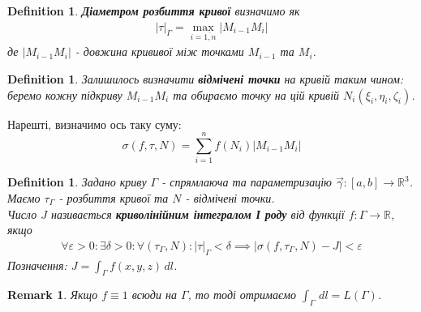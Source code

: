 \documentclass[a4paper, 10pt]{article}
\def\huge{\displaystyle}
\theoremstyle{theoremdd}
\theoremstyle{theoremdd}
\newtheorem{definition}[theorem]{Definition}
\theoremstyle{theoremdd}
\theoremstyle{theoremdd}
\theoremstyle{theoremdd}
\theoremstyle{theoremdd}
\newtheorem{remark}[theorem]{Remark}
\theoremstyle{theoremdd}
\theoremstyle{theoremdd}
\newcommand\Norm[1]{\left\lVert#1\right\rVert}
\begin{document}
\begin{definition}
\textbf{Діаметром розбиття кривої} визначимо як
\begin{align*}
| \tau |_\Gamma = \max_{i = \overline{1,n}} |M_{i-1}M_{i}|
\end{align*}
де $|M_{i-1}M_i|$ - довжина крививої між точками $M_{i-1}$ та $M_i$.
\end{definition}

\begin{definition}
Залишилось визначити \textbf{відмічені точки} на кривій таким чином: беремо кожну підкриву $M_{i-1}M_i$ та обираємо точку на цій кривій $N_i(\xi_i,\eta_i,\zeta_i)$.
\end{definition}

Нарешті, визначимо ось таку суму:
$$ \sigma(f,\tau,N) = \displaystyle\sum_{i=1}^n f(N_i) |M_{i-1}M_i|$$

\begin{definition}
Задано криву $\Gamma$ - спрямлаюча та параметризацію $\vec{\gamma}: [a,b] \to \mathbb{R}^3$. Маємо $\tau_\Gamma$ - розбиття кривої та $N$ - відмічені точки.\\
Число $J$ називається \textbf{криволінійним інтегралом І роду} від функції $f: \Gamma \to \mathbb{R}$, якщо
\begin{align*}
\forall \varepsilon > 0: \exists \delta > 0: \forall (\tau_\Gamma, N): |\tau|_\Gamma < \delta \implies |\sigma(f,\tau_\Gamma,N) - J| < \varepsilon
\end{align*}
Позначення: $J = \displaystyle\int_\Gamma f(x,y,z)\,dl$.
\end{definition}

\begin{remark}
Якщо $f \equiv 1$ всюди на $\Gamma$, то тоді отримаємо $\displaystyle\int_\Gamma \,dl = L(\Gamma)$.
\end{remark}
\end{document}
